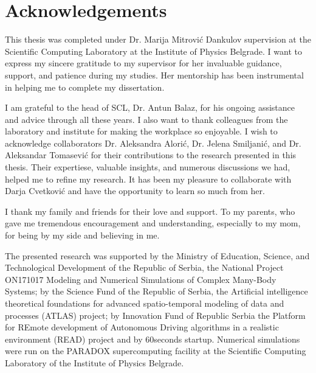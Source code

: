 
\normalsize
\chapter{Acknowledgements}

This thesis was completed under Dr. Marija Mitrović Dankulov supervision at the Scientific Computing Laboratory at the Institute of Physics Belgrade. I want to express my sincere gratitude to my supervisor for her invaluable guidance, support, and patience during my studies. Her mentorship has been instrumental in helping me to complete my dissertation.  

I am grateful to the head of SCL, Dr. Antun Balaz, for his ongoing assistance and advice through all these years. I also want to thank colleagues from the laboratory and institute for making the workplace so enjoyable. I wish to acknowledge collaborators Dr. Aleksandra Alorić, Dr. Jelena Smiljanić, and Dr. Aleksandar Tomasević for their contributions to the research presented in this thesis. Their expertiese, valuable insights, and numerous discussions we had, helped me to refine my research. It has been my pleasure to collaborate with Darja Cvetković and have the opportunity to learn so much from her.

I thank my family and friends for their love and support. To my parents, who gave me tremendous encouragement and understanding, especially to my mom, for being by my side and believing in me.

The presented research was supported by the Ministry of Education, Science, and Technological Development of the Republic of Serbia, the National Project ON171017 Modeling and Numerical Simulations of Complex Many-Body Systems; by the Science Fund of the Republic of Serbia, the Artificial intelligence theoretical foundations for advanced spatio-temporal modeling of data and processes (ATLAS) project; by Innovation Fund of Republic Serbia the Platform for REmote development of Autonomous Driving algorithms in a realistic environment (READ) project and by 60seconds startup. Numerical simulations were run on the PARADOX supercomputing facility at the Scientific Computing Laboratory of the Institute of Physics Belgrade.

\hfill

\justify
